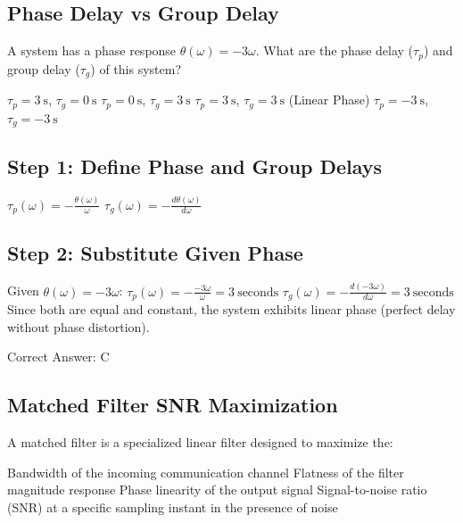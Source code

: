 \clearpage

\subsection{Phase Delay vs Group Delay}

A system has a phase response $\theta(\omega) = -3\omega$. What are the phase delay ($\tau_p$) and group delay ($\tau_g$) of this system?

\begin{choices}
    \choice $\tau_p = 3\ \text{s}$, $\tau_g = 0\ \text{s}$
    \choice $\tau_p = 0\ \text{s}$, $\tau_g = 3\ \text{s}$
    \correctchoice $\tau_p = 3\ \text{s}$, $\tau_g = 3\ \text{s}$ (Linear Phase)
    \choice $\tau_p = -3\ \text{s}$, $\tau_g = -3\ \text{s}$
\end{choices}

\begin{solution}

\subsection*{Step 1: Define Phase and Group Delays}
$\tau_p(\omega) = -\frac{\theta(\omega)}{\omega}$
$\tau_g(\omega) = -\frac{d\theta(\omega)}{d\omega}$

\subsection*{Step 2: Substitute Given Phase}
Given $\theta(\omega) = -3\omega$:
$\tau_p(\omega) = -\frac{-3\omega}{\omega} = 3\ \text{seconds}$
$\tau_g(\omega) = -\frac{d(-3\omega)}{d\omega} = 3\ \text{seconds}$
Since both are equal and constant, the system exhibits linear phase (perfect delay without phase distortion).

Correct Answer: C
\end{solution}

\clearpage

\subsection{Matched Filter SNR Maximization}

A matched filter is a specialized linear filter designed to maximize the:

\begin{choices}
    \choice Bandwidth of the incoming communication channel
    \choice Flatness of the filter magnitude response
    \choice Phase linearity of the output signal
    \correctchoice Signal-to-noise ratio (SNR) at a specific sampling instant in the presence of noise
\end{choices}

